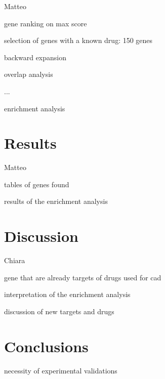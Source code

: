\documentclass[fleqn,10pt]{SelfArx} %
\begin{document}
Matteo

gene ranking on max score

selection of genes with a known drug: 150 genes

backward expansion

overlap analysis

...

enrichment analysis

\section*{Results}
Matteo

tables of genes found

results of the enrichment analysis

\section*{Discussion}
Chiara

gene that are already targets of drugs used for cad

interpretation of the enrichment analysis

discussion of new targets and drugs

\section*{Conclusions}

necessity of experimental validations
\end{document}
